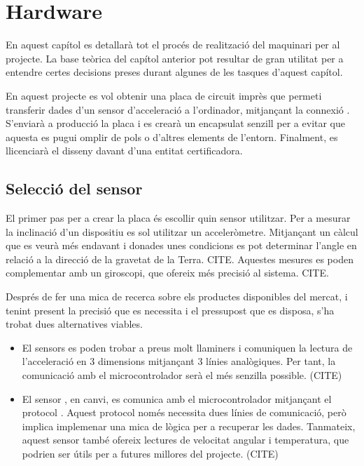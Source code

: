 \chapter{Hardware}

En aquest capítol es detallarà tot el procés de realització del maquinari per
al projecte. La base teòrica del capítol anterior pot resultar de gran utilitat
per a entendre certes decisions preses durant algunes de les tasques d'aquest
capítol.

En aquest projecte es vol obtenir una placa de circuit imprès que permeti
transferir dades d'un sensor d'acceleració a l'ordinador, mitjançant la connexió
. S'enviarà a producció la placa i es crearà un encapsulat senzill per
a evitar que aquesta es pugui omplir de pols o d'altres elements de l'entorn.
Finalment, es llicenciarà el disseny davant d'una entitat certificadora.

\section{Selecció del sensor}

El primer pas per a crear la placa és escollir quin sensor utilitzar. Per a
mesurar la inclinació d'un dispositiu es sol utilitzar un acceleròmetre.
Mitjançant un càlcul que es veurà més endavant i donades unes condicions es pot
determinar l'angle en relació a la direcció de la gravetat de la Terra. CITE.
Aquestes mesures es poden complementar amb un giroscopi, que ofereix més
precisió al sistema. CITE.

Després de fer una mica de recerca sobre els productes disponibles del mercat,
i tenint present la precisió que es necessita i el pressupost que es disposa,
s'ha trobat dues alternatives viables.

\begin{itemize}
    \item El sensors  es poden trobar a preus molt llaminers i
    comuniquen la lectura de l'acceleració en 3 dimensions mitjançant 3 línies
    analògiques. Per tant, la comunicació amb el microcontrolador serà el més
    senzilla possible. (CITE)
    \item El sensor , en canvi, es comunica amb el microcontrolador
    mitjançant el protocol . Aquest protocol només necessita dues
    línies de comunicació, però implica implemenar una mica de lògica per a
    recuperar les dades. Tanmateix, aquest sensor també ofereix lectures de
    velocitat angular i temperatura, que podrien ser útils per a futures
    millores del projecte. (CITE)
\end{itemize}

